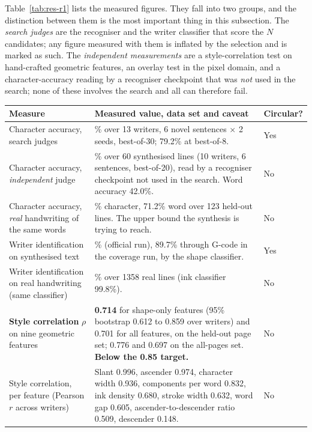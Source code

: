 
            Table~\ref{tab:res-r1} lists the measured figures.
            They fall into two groups, and the distinction between them is the most important thing in this subsection.
            The \emph{search judges} are the recogniser and the writer classifier that score the $N$ candidates; any figure measured with them is inflated by the selection and is marked as such.
            The \emph{independent measurements} are a style-correlation test on hand-crafted geometric features, an overlay test in the pixel domain, and a character-accuracy reading by a recogniser checkpoint that was \emph{not} used in the search; none of these involves the search and all can therefore fail.

\begin{table}[h]
\centering
\fontsize{9.5}{11.5}\selectfont
\begin{tabularx}{\linewidth}{|>{\raggedright\arraybackslash}p{4.6cm}|>{\raggedright\arraybackslash}X|>{\raggedright\arraybackslash}p{2.0cm}|}
\hline
\textbf{Measure} & \textbf{Measured value, data set and caveat} & \textbf{Circular?} \\
\hline
Character accuracy, search judges & 82.2\% over 13 writers, 6 novel sentences $\times$ 2 seeds, best-of-30; 79.2\% at best-of-8. & Yes \\
\hline
Character accuracy, \emph{independent} judge & 81.2\% over 60 synthesised lines (10 writers, 6 sentences, best-of-20), read by a recogniser checkpoint not used in the search. Word accuracy 42.0\%. & No \\
\hline
Character accuracy, \emph{real} handwriting of the same words & 89.0\% character, 71.2\% word over 123 held-out lines. The upper bound the synthesis is trying to reach. & No \\
\hline
Writer identification on synthesised text & 80.1\% (official run), 89.7\% through G-code in the coverage run, by the shape classifier. & Yes \\
\hline
Writer identification on real handwriting (same classifier) & 93.7\% over 1358 real lines (ink classifier 99.8\%). & No \\
\hline
\textbf{Style correlation} $\rho$ on nine geometric features & \textbf{0.714} for shape-only features (95\% bootstrap 0.612 to 0.859 over writers) and 0.701 for all features, on the held-out page set; 0.776 and 0.697 on the all-pages set. \textbf{Below the 0.85 target.} & No \\
\hline
Style correlation, per feature (Pearson $r$ across writers) & Slant 0.996, ascender 0.974, character width 0.936, components per word 0.832, ink density 0.680, stroke width 0.632, word gap 0.605, ascender-to-descender ratio 0.509, descender 0.148. & No \\

\end{tabularx}
\end{table}
